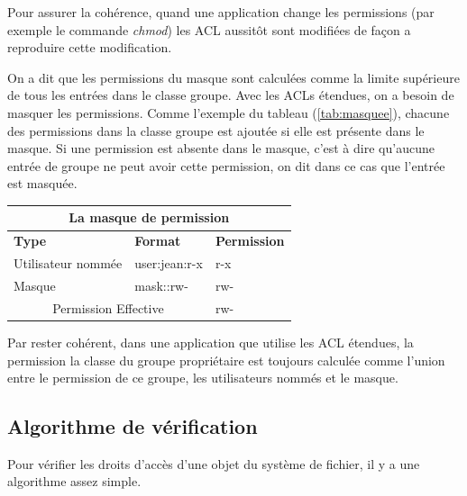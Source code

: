 \documentclass{article}
\begin{document}
 
Pour assurer la cohérence, quand une application change les permissions (par exemple le commande \emph{chmod}) les ACL aussitôt sont modifiées de façon a reproduire cette modification.
 
On a dit que les permissions du masque sont calculées comme la limite supérieure de tous les entrées dans le classe groupe. Avec les ACLs étendues, on a besoin de masquer les permissions. Comme l'exemple du tableau (\ref{tab:masquee}), chacune des permissions dans la classe groupe est ajoutée si elle est présente dans le masque. Si une permission est absente dans le masque, c'est à dire qu'aucune entrée de groupe ne peut avoir cette permission, on dit dans ce cas que l'entrée est masquée.
 
\begin{center}
\begin{tabular}{|l|l|l|}
  \hline
    \multicolumn{3}{|c|}{La masque de permission} \\
  \hline
\textbf{Type} & \textbf{Format} & \textbf{Permission} \\
  \hline
Utilisateur nommée & user:jean:r-x & r-x\\
  \hline
Masque & mask::rw- & rw-\\
  \hline
\multicolumn{2}{|c|}{Permission Effective} & rw-\\
  \hline
\end{tabular}
\label{tab:masque}
\end{center}


Par rester cohérent, dans une application que utilise les ACL étendues, la permission la classe du groupe propriétaire est toujours calculée comme l'union entre le permission de ce groupe, les utilisateurs nommés et le masque.  
 
\subsection{Algorithme de vérification}
 
Pour vérifier les droits d'accès d'une objet du système de fichier, il y a une algorithme assez simple.
 
\end{document}
